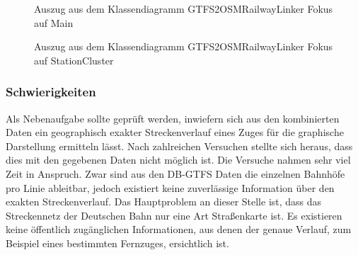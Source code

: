 \begin{figure}[htb]
   \centering
   \caption{Auszug aus dem Klassendiagramm GTFS2OSMRailwayLinker Fokus auf Main}
   \label{fig:gtfs2osm:uml_main}
 \end{figure}


\begin{figure}[htb]
   \centering
   \caption{Auszug aus dem Klassendiagramm GTFS2OSMRailwayLinker Fokus auf StationCluster}
   \label{fig:gtfs2osm:uml_stationcluster}
 \end{figure}

\subsubsection{Schwierigkeiten}

Als Nebenaufgabe sollte geprüft werden, inwiefern sich aus den kombinierten Daten ein geographisch exakter Streckenverlauf eines Zuges für die graphische Darstellung ermitteln lässt.
Nach zahlreichen Versuchen stellte sich heraus, dass dies mit den gegebenen Daten nicht möglich ist.
Die Versuche nahmen sehr viel Zeit in Anspruch.
Zwar sind aus den DB-GTFS Daten die einzelnen Bahnhöfe pro Linie ableitbar, jedoch existiert keine zuverlässige Information über den exakten Streckenverlauf.
Das Hauptproblem an dieser Stelle ist, dass das Streckennetz der Deutschen Bahn nur eine Art Straßenkarte ist.
Es existieren keine öffentlich zugänglichen Informationen, aus denen der genaue Verlauf, zum Beispiel eines bestimmten Fernzuges, ersichtlich ist.

